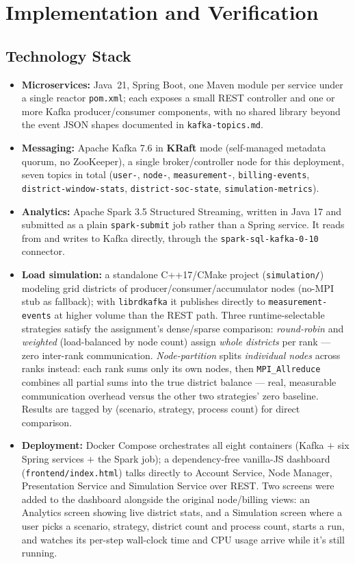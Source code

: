 \section{Implementation and Verification}

\subsection*{Technology Stack}
\begin{itemize}
\item \textbf{Microservices:} Java~21, Spring Boot, one Maven module per service under a single
  reactor \texttt{pom.xml}; each exposes a small REST controller and one or more Kafka
  producer/consumer components, with no shared library beyond the event JSON shapes documented in
  \texttt{kafka-topics.md}.
\item \textbf{Messaging:} Apache Kafka 7.6 in \textbf{KRaft} mode (self-managed metadata quorum,
  no ZooKeeper), a single broker/controller node for this deployment, seven topics in total
  (\texttt{user-}, \texttt{node-}, \texttt{measurement-}, \texttt{billing-events},
  \texttt{district-window-stats}, \texttt{district-soc-state}, \texttt{simulation-metrics}).
\item \textbf{Analytics:} Apache Spark 3.5 Structured Streaming, written in Java 17 and submitted
  as a plain \texttt{spark-submit} job rather than a Spring service. It reads from and writes to
  Kafka directly, through the \texttt{spark-sql-kafka-0-10} connector.
\item \textbf{Load simulation:} a standalone C++17/CMake project (\texttt{simulation/}) modeling
  grid districts of producer/consumer/accumulator nodes (no-MPI stub as fallback); with
  \texttt{librdkafka} it publishes directly to \texttt{measurement-events} at higher volume than
  the REST path. Three runtime-selectable strategies satisfy the assignment's dense/sparse
  comparison: \emph{round-robin} and \emph{weighted} (load-balanced by node count) assign
  \emph{whole districts} per rank --- zero inter-rank communication. \emph{Node-partition} splits
  \emph{individual nodes} across ranks instead: each rank sums only its own nodes, then
  \texttt{MPI\_Allreduce} combines all partial sums into the true district balance --- real,
  measurable communication overhead versus the other two strategies' zero baseline. Results are
  tagged by (scenario, strategy, process count) for direct comparison.
\item \textbf{Deployment:} Docker Compose orchestrates all eight containers (Kafka $+$ six Spring
  services $+$ the Spark job); a dependency-free vanilla-JS dashboard
  (\texttt{frontend/index.html}) talks directly to Account Service, Node Manager, Presentation
  Service and Simulation Service over REST. Two screens were added to the dashboard alongside the
  original node/billing views: an Analytics screen showing live district stats, and a Simulation
  screen where a user picks a scenario, strategy, district count and process count, starts a run,
  and watches its per-step wall-clock time and CPU usage arrive while it's still running.
\end{itemize}

